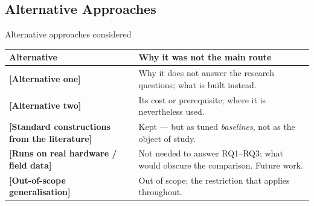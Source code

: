 \documentclass[aspectratio=43, 11pt, xcolor=dvipsnames, compress]{beamer}
\renewcommand{\cite}[2][]{\unskip}   %
\begin{document}
\subsection{Alternative Approaches}
\begin{frame}{Alternative approaches considered}
  \footnotesize
  \renewcommand{\arraystretch}{1.15}
  \begin{tabularx}{\textwidth}{@{}>{\raggedright\arraybackslash\bfseries}p{} >{\raggedright\arraybackslash}X@{}}
    \toprule
    Alternative & Why it was not the main route \\
    \midrule
    {}[Alternative one]~\cite{example_article} & Why it does not answer the research questions; what is built instead. \\
    {}[Alternative two] & Its cost or prerequisite; where it is nevertheless used. \\
    {}[Standard constructions from the literature] & Kept --- but as tuned \emph{baselines}, not as the object of study. \\
    {}[Runs on real hardware / field data] & Not needed to answer RQ1--RQ3; what would obscure the comparison. Future work. \\
    {}[Out-of-scope generalisation]~\cite{example_book} & Out of scope; the restriction that applies throughout. \\
    \bottomrule
  \end{tabularx}
\end{frame}
\end{document}
